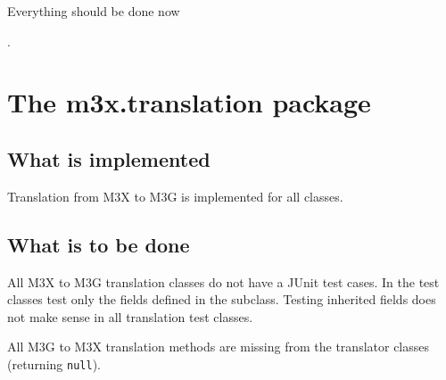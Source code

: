 \documentclass[a4paper,twoside]{article}
\begin{document}
Everything should be done now \date{\today}.

\section{The m3x.translation package}

\subsection{What is implemented}

Translation from M3X to M3G is implemented for all classes.

\subsection{What is to be done}

All M3X to M3G translation classes do not have a JUnit test cases. In the
test classes test only the fields defined in the subclass. Testing
inherited fields does not make sense in all translation test classes.

All M3G to M3X translation methods are missing from the translator classes
(returning \texttt{null}).
\end{document}
